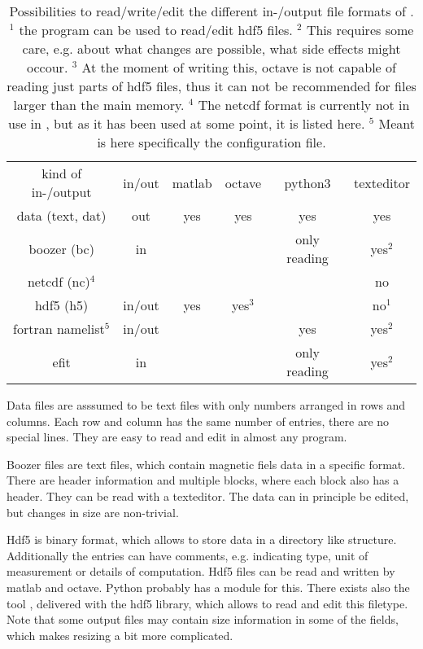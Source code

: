 \begin{table}
  \begin{center}
    \begin{tabular}{cccccc}
kind of in-/output & in/out & matlab & octave & python3 & texteditor \\
data (text, dat)   & out    & yes    & yes    & yes     & yes \\
boozer (bc)        & in     &        &        & only reading & yes$^2$ \\
netcdf (nc)$^4$    &        &        &        &         & no \\
hdf5 (h5)          & in/out & yes    & yes$^3$&         & no$^1$ \\
fortran namelist$^5$&in/out &        &        & yes     & yes$^2$ \\
efit               & in     &        &        & only reading & yes$^2$
    \end{tabular}
    \caption{Possibilities to read/write/edit the different in-/output
file formats of \neotwo.
$^1$ the program  can be used to read/edit hdf5 files.
$^2$ This requires some care, e.g. about what changes are possible, what
side effects might occour.
$^3$ At the moment of writing this, octave is not capable of reading
just parts of hdf5 files, thus it can not be recommended for files
larger than the main memory.
$^4$ The netcdf format is currently not in use in \neotwo, but as it has
been used at some point, it is listed here.
$^5$ Meant is here specifically the \neotwo configuration file.}
    \label{tablereadinginoutput}
  \end{center}
\end{table}

Data files are asssumed to be text files with only numbers arranged in
rows and columns. Each row and column has the same number of entries,
there are no special lines.
They are easy to read and edit in almost any program.

Boozer files are text files, which contain magnetic fiels data in a
specific format. There are header information and multiple blocks, where
each block also has a header.
They can be read with a texteditor. The data can in principle be edited,
but changes in size are non-trivial.

Hdf5 is binary format, which allows to store data in a directory like
structure. Additionally the entries can have comments, e.g. indicating
type, unit of measurement or details of computation.
Hdf5 files can be read and written by matlab and octave. Python probably
has a module for this. There exists also the tool ,
delivered with the hdf5 library, which allows to read and edit this
filetype.
Note that some output files may contain size information in some of the
fields, which makes resizing a bit more complicated.

